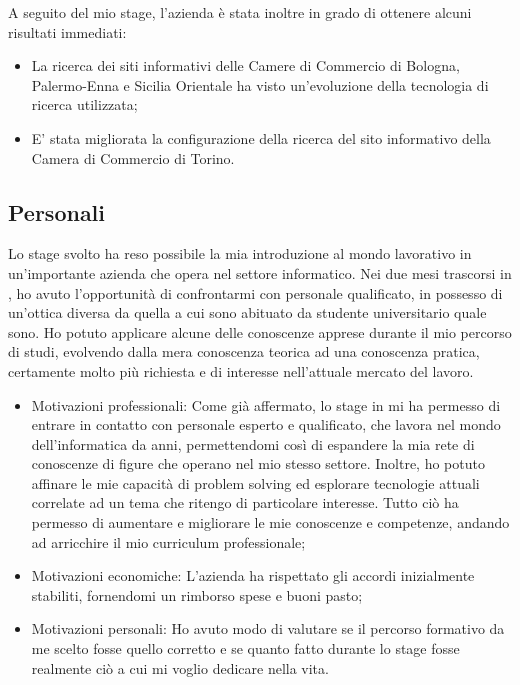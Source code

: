 	A seguito del mio stage, l'azienda è stata inoltre in grado di ottenere alcuni risultati immediati:
	\begin{itemize}
		\item {La ricerca dei siti informativi delle Camere di Commercio di Bologna, Palermo-Enna e Sicilia Orientale ha visto un'evoluzione della tecnologia di ricerca utilizzata;}
		\item {E' stata migliorata la configurazione della ricerca del sito informativo della Camera di Commercio di Torino.}
	\end{itemize}

	\subsection{Personali}
	Lo stage svolto ha reso possibile la mia introduzione al mondo lavorativo in un'importante azienda che opera nel settore informatico. Nei due mesi trascorsi in \nomeAzienda, ho avuto l'opportunità di confrontarmi con personale qualificato, in possesso di un'ottica diversa da quella a cui sono abituato da studente universitario quale sono. Ho potuto applicare alcune delle conoscenze apprese durante il mio percorso di studi, evolvendo dalla mera conoscenza teorica ad una conoscenza pratica, certamente molto più richiesta e di interesse nell'attuale mercato del lavoro.
	
	\begin{itemize}
		
		\item {Motivazioni professionali: Come già affermato, lo stage in \nomeAzienda mi ha permesso di entrare in contatto con personale esperto e qualificato, che lavora nel mondo dell'informatica da anni, permettendomi così di espandere la mia rete di conoscenze di figure che operano nel mio stesso settore. Inoltre, ho potuto affinare le mie capacità di problem solving ed esplorare tecnologie attuali correlate ad un tema che ritengo di particolare interesse. Tutto ciò ha permesso di aumentare e migliorare le mie conoscenze e competenze, andando ad arricchire il mio curriculum professionale;}
		
		\item {Motivazioni economiche: L'azienda ha rispettato gli accordi inizialmente stabiliti, fornendomi un rimborso spese e buoni pasto;}
		
		\item {Motivazioni personali: Ho avuto modo di valutare se il percorso formativo da me scelto fosse quello corretto e se quanto fatto durante lo stage fosse realmente ciò a cui mi voglio dedicare nella vita.}
		
	\end{itemize}

